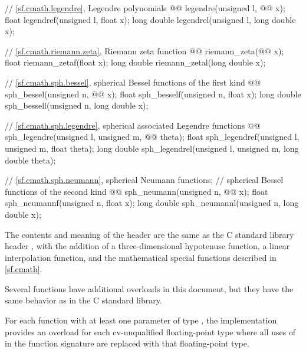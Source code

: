 \begin{codeblock}
{  // \ref{sf.cmath.legendre}, Legendre polynomials
  @@ legendre(unsigned l, @@ x);
  float        legendref(unsigned l, float x);
  long double  legendrel(unsigned l, long double x);

  // \ref{sf.cmath.riemann.zeta}, Riemann zeta function
  @@ riemann_zeta(@@ x);
  float        riemann_zetaf(float x);
  long double  riemann_zetal(long double x);

  // \ref{sf.cmath.sph.bessel}, spherical Bessel functions of the first kind
  @@ sph_bessel(unsigned n, @@ x);
  float        sph_besself(unsigned n, float x);
  long double  sph_bessell(unsigned n, long double x);

  // \ref{sf.cmath.sph.legendre}, spherical associated Legendre functions
  @@ sph_legendre(unsigned l, unsigned m, @@ theta);
  float        sph_legendref(unsigned l, unsigned m, float theta);
  long double  sph_legendrel(unsigned l, unsigned m, long double theta);

  // \ref{sf.cmath.sph.neumann}, spherical Neumann functions;
  // spherical Bessel functions of the second kind
  @@ sph_neumann(unsigned n, @@ x);
  float        sph_neumannf(unsigned n, float x);
  long double  sph_neumannl(unsigned n, long double x);
}
\end{codeblock}

\pnum
The contents and meaning of the header 
are the same as the C standard library header ,
with the addition of
a three-dimensional hypotenuse function,
a linear interpolation function, and
the mathematical special functions described in \ref{sf.cmath}.
\begin{note}
Several functions have additional overloads in this document,
but they have the same behavior as in the C standard library.
\end{note}

\pnum
For each function
with at least one parameter of type ,
the implementation provides
an overload for each cv-unqualified floating-point type
where all uses of  in the function signature
are replaced with that floating-point type.

